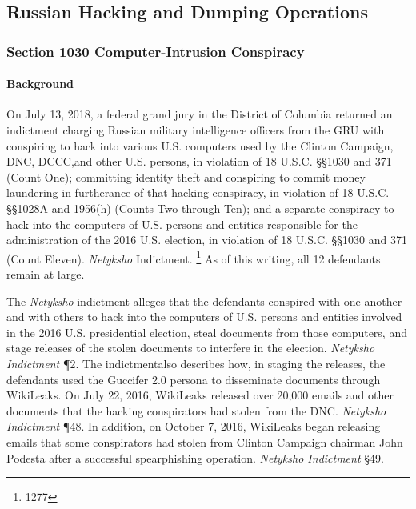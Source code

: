 \subsection{Russian Hacking and Dumping Operations}

\subsubsection{Section 1030 Computer-Intrusion Conspiracy}

\paragraph{Background}

On July 13, 2018, a federal grand jury in the District of Columbia returned an indictment charging Russian military intelligence officers from the GRU with conspiring to hack into various U.S. computers used by the Clinton Campaign, DNC, DCCC,and other U.S. persons, in violation of 18 U.S.C. \S\S 1030 and 371 (Count One); committing identity theft and conspiring to commit money laundering in furtherance of that hacking conspiracy, in violation of 18 U.S.C. \S\S 1028A and 1956(h) (Counts Two through Ten); and a separate conspiracy to hack into the computers of U.S. persons and entities responsible for the administration of the 2016 U.S. election, in violation of 18 U.S.C. \S\S 1030 and 371 (Count Eleven). 
\textit{Netyksho} Indictment.%
\footnote{1277}
As of this writing, all 12 defendants remain at large.

The \textit{Netyksho} indictment alleges that the defendants conspired with one another and with others to hack into the computers of U.S. persons and entities involved in the 2016 U.S. presidential election, steal documents from those computers, and stage releases of the stolen documents to interfere in the election. 
\textit{Netyksho Indictment} \P 2. 
The indictmentalso describes how, in staging the releases, the defendants used the Guccifer 2.0 persona to disseminate documents through WikiLeaks. 
On July 22, 2016, WikiLeaks released over 20,000 emails and other documents that the hacking conspirators had stolen from the DNC. 
\textit{Netyksho Indictment} \P 48. 
In addition, on October 7, 2016, WikiLeaks began releasing emails that some conspirators had stolen from Clinton Campaign chairman John Podesta after a successful spearphishing operation. 
\textit{Netyksho Indictment} \S 49.



